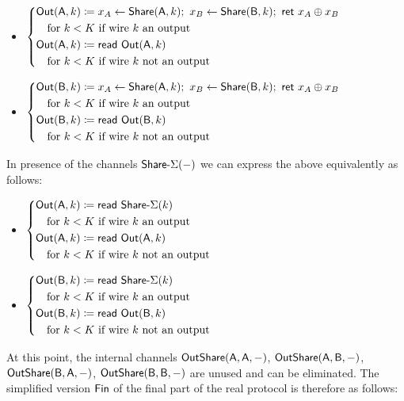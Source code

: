 \begin{itemize}
\item $\begin{cases*} \Out(\A,k) \coloneqq x_A \leftarrow \Share(\A,k); \ x_B \leftarrow \Share(\B,k); \ \ret{x_A \oplus x_B} \\ \hspace{10pt} \text{for $k < K$ if wire $k$ an output} \\ \Out(\A,k) \coloneqq \read{\Out(\A,k)} \\ \hspace{10pt} \text{for $k < K$ if wire $k$ not an output} \end{cases*}$
\item $\begin{cases*} \Out(\B,k) \coloneqq x_A \leftarrow \Share(\A,k); \ x_B \leftarrow \Share(\B,k); \ \ret{x_A \oplus x_B} \\ \hspace{10pt} \text{for $k < K$ if wire $k$ an output} \\ \Out(\B,k) \coloneqq \read{\Out(\B,k)} \\ \hspace{10pt} \text{for $k < K$ if wire $k$ not an output} \end{cases*}$
\end{itemize}
In presence of the channels $\mathsf{Share}\textsf{-}\Sigma(-)$ we can express the above equivalently as follows:
\begin{itemize}
\item $\begin{cases*} \Out(\A,k) \coloneqq \read{\SumShare(k)} \\ \hspace{10pt} \text{for $k < K$ if wire $k$ an output} \\ \Out(\A,k) \coloneqq \read{\Out(\A,k)} \\ \hspace{10pt} \text{for $k < K$ if wire $k$ not an output} \end{cases*}$
\item $\begin{cases*} \Out(\B,k) \coloneqq \read{\SumShare(k)} \\ \hspace{10pt} \text{for $k < K$ if wire $k$ an output} \\ \Out(\B,k) \coloneqq \read{\Out(\B,k)} \\ \hspace{10pt} \text{for $k < K$ if wire $k$ not an output} \end{cases*}$
\end{itemize}
At this point, the internal channels $\mathsf{OutShare}(\mathsf{A},\mathsf{A},-)$, $\mathsf{OutShare}(\mathsf{A},\mathsf{B},-)$, $\mathsf{OutShare}(\mathsf{B},\mathsf{A},-)$, $\mathsf{OutShare}(\mathsf{B},\mathsf{B},-)$ are unused and can be eliminated. The simplified version $\mathsf{Fin}$ of the final part of the real protocol is therefore as follows:

